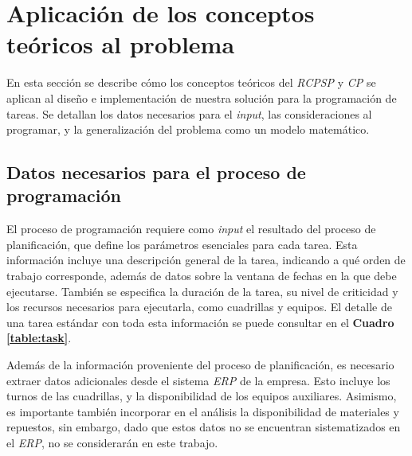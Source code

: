 \documentclass{article}
\begin{document}
\section{Aplicación de los conceptos teóricos al problema}

En esta sección se describe cómo los conceptos teóricos del \textit{RCPSP} y \textit{CP} se aplican al diseño e implementación de nuestra solución para la programación de tareas. Se detallan los datos necesarios para el \textit{input}, las consideraciones al programar, y la generalización del problema como un modelo matemático.

\subsection{Datos necesarios para el proceso de programación}  

El proceso de programación requiere como \textit{input} el resultado del proceso de planificación, que define los parámetros esenciales para cada tarea. Esta información incluye una descripción general de la tarea, indicando a qué orden de trabajo corresponde, además de datos sobre la ventana de fechas en la que debe ejecutarse. También se especifica la duración de la tarea, su nivel de criticidad y los recursos necesarios para ejecutarla, como cuadrillas y equipos. El detalle de una tarea estándar con toda esta información se puede consultar en el \textbf{Cuadro \ref{table:task}}.  

Además de la información proveniente del proceso de planificación, es necesario extraer datos adicionales desde el sistema \textit{ERP} de la empresa. Esto incluye los turnos de las cuadrillas, y la disponibilidad de los equipos auxiliares. Asimismo, es importante también incorporar en el análisis la disponibilidad de materiales y repuestos, sin embargo, dado que estos datos no se encuentran sistematizados en el \textit{ERP}, no se considerarán en este trabajo.
\end{document}

